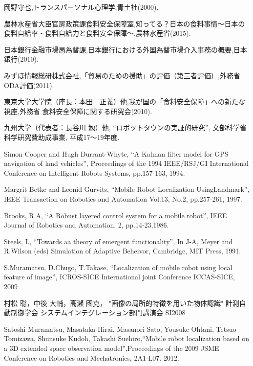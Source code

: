 \begin{thebibliography}{99}

岡野守也,トランスパーソナル心理学,青土社(2000).

農林水産省大臣官房政策課食料安全保障室,知ってる？日本の食料事情～日本の食料自給率・食料自給力と食料安全保障～,農林水産省(2015).


日本銀行金融市場局為替課,日本銀行における外国為替市場介入事務の概要,日本銀行(2010).

みずほ情報総研株式会社,「貿易のための援助」の評価（第三者評価）,外務省ODA評価(2011).

東京大学大学院（座長：本田　正義）他,我が国の「食料安全保障」への新たな視座,外務省 食料安全保障に関する研究会(2010).


九州大学（代表者：長谷川 勉）他, ``ロボットタウンの実証的研究'', 文部科学省 科学研究費助成事業, 平成17〜19年度.

Simon Cooper and Hugh Durrant-Whyte, 
``A Kalman filter model for GPS navigation of land vehicles'',
 Proceedings of the 1994 IEEE/RSJ/GI International Conference on Intelligent Robots Systems, pp.157-163, 1994.

Margrit Betke and Leonid Gurvits, 
``Mobile Robot Localization UsingLandmark'', 
IEEE Transaction on Robotics and Automation Vol.13, No.2, pp.257-261, 1997.

Brooks, R.A, ``A Robust layered control system for a mobile robot'', IEEE Journal of Robotics and Automation, 2, pp.14-23,1986.

Steels, L, ``Towards aa theory of emergent functionality'', In J-A, Meyer and R.Wilson (eds) Simulation of Adaptive Beheivor, Cambridge, MIT Press, 1991.

\newblock S.Muramatsu, D.Chugo, T.Takase,
``Localization of mobile robot using local feature of image'',
\newblock ICROS-SICE International joint Conference ICCAS-SICE, 2009

\newblock 村松 聡，中後 大輔，高瀬 國克，
"画像の局所的特徴を用いた物体認識"
\newblock 計測自動制御学会 システムインテグレーション部門講演会 SI2008

Satoshi Muramatsu, Masataka Hirai, Masanori Sato, Yousuke Ohtani, Tetsuo Tomizawa, Shunsuke Kudoh, Takashi Suehiro,``Mobile robot localization based on a 3D extended space observation model'',Proceedings of the 2009 JSME Conference on Robotics and Mechatronics, 2A1-L07. 2012.
\fi
\end{thebibliography}

